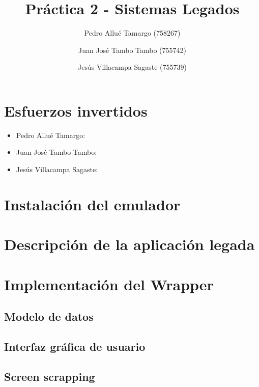 \documentclass[10pt,a4paper]{article}
\begin{document}
\begin{titlepage}
\title{\textbf{{\Huge Práctica 2 - Sistemas Legados}}}
\author{
	Pedro Allué Tamargo (758267)
	\and
	Juan José Tambo Tambo (755742)
	\and
	Jesús Villacampa Sagaste (755739)
}
\clearpage\maketitle
\thispagestyle{empty}
\tableofcontents
\end{titlepage}

\section{Esfuerzos invertidos}

\begin{itemize}
\item Pedro Allué Tamargo:
\item Juan José Tambo Tambo:
\item Jesús Villacampa Sagaste:
\end{itemize}

\section{Instalación del emulador}

\section{Descripción de la aplicación legada}

\section{Implementación del Wrapper}

\subsection{Modelo de datos}

\subsection{Interfaz gráfica de usuario}

\subsection{Screen scrapping}
\end{document}
